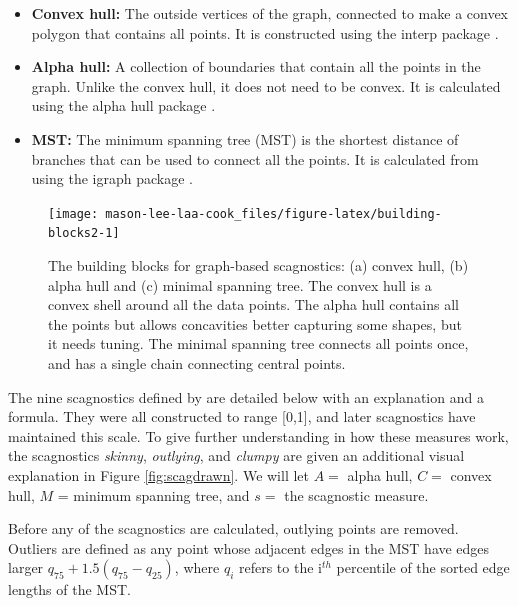 \begin{itemize}
\item
  \textbf{Convex hull:} The outside vertices of the graph, connected to make a convex polygon that contains all points. It is constructed using the interp package \citep{interp}.
\item
  \textbf{Alpha hull:} A collection of boundaries that contain all the points in the graph. Unlike the convex hull, it does not need to be convex. It is calculated using the alpha hull package \citep{alphahull}.
\item
  \textbf{MST:} The minimum spanning tree (MST) is the shortest distance of branches that can be used to connect all the points. It is calculated from using the igraph package \citep{igraph}.
\end{itemize}

\begin{figure}
\texttt{[image: mason-lee-laa-cook\_files/figure-latex/building-blocks2-1]} \caption{The building blocks for graph-based scagnostics: (a) convex hull, (b) alpha hull and (c) minimal spanning tree. The convex hull is a convex shell around all the data points. The alpha hull contains all the points but allows concavities better capturing some shapes, but it needs tuning. The minimal spanning tree connects all points once, and has a single chain connecting central points.}\label{fig:building-blocks2}
\end{figure}

The nine scagnostics defined by \citet{scagdist} are detailed below with an explanation and a formula. They were all constructed to range {[}0,1{]}, and later scagnostics have maintained this scale. To give further understanding in how these measures work, the scagnostics \emph{skinny}, \emph{outlying}, and \emph{clumpy} are given an additional visual explanation in Figure \ref{fig:scagdrawn}. We will let \(A=\) alpha hull, \(C=\) convex hull, \(M\) = minimum spanning tree, and \(s=\) the scagnostic measure.

Before any of the scagnostics are calculated, outlying points are removed. Outliers are defined as any point whose adjacent edges in the MST have edges larger \(q_{75} + 1.5(q_{75} - q_{25})\), where \(q_i\) refers to the i\(^{th}\) percentile of the sorted edge lengths of the MST.

